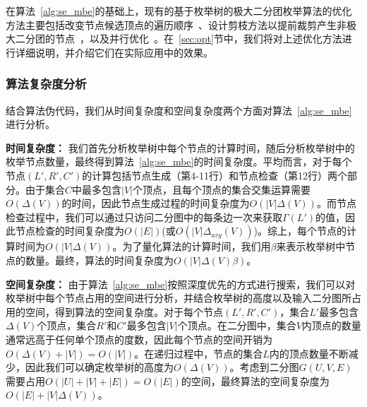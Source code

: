 在算法~\ref{alg:se_mbe}的基础上，现有的基于枚举树的极大二分团枚举算法的优化方法主要包括改变节点候选顶点的遍历顺序~\cite{minel06,iMBEA14,PMBE20,ooMBE22}、设计剪枝方法以提前裁剪产生非极大二分团的节点~\cite{iMBEA14,PMBE20,ooMBE22}，以及并行优化~\cite{mapreduceMBE16,parMBE19}。在~\ref{sec:opt}节中，我们将对上述优化方法进行详细说明，并介绍它们在实际应用中的效果。

\subsubsection{算法复杂度分析}
\label{subsec:baseline_analysis}

结合算法伪代码，我们从时间复杂度和空间复杂度两个方面对算法~\ref{alg:se_mbe}进行分析。

\textbf{时间复杂度：} 我们首先分析枚举树中每个节点的计算时间，随后分析枚举树中的枚举节点数量，最终得到算法~\ref{alg:se_mbe}的时间复杂度。平均而言，对于每个节点$(L',R',C')$的计算包括节点生成（第4-11行）和节点检查（第12行）两个部分。由于集合$C$中最多包含$|V|$个顶点，且每个顶点的集合交集运算需要$O(\Delta(V))$的时间，因此节点生成过程的时间复杂度为$O(|V|\Delta(V))$。而节点检查过程中，我们可以通过只访问二分图中的每条边一次来获取$\Gamma(L')$的值，因此节点检查的时间复杂度为$O(|E|)$(或$O(|V|\Delta_{avg}(V))$)。综上，每个节点的计算时间为$O(|V|\Delta(V))$。为了量化算法的计算时间，我们用$\beta$来表示枚举树中节点的数量。最终，算法的时间复杂度为$O(|V|\Delta(V)\beta)$。

\textbf{空间复杂度：} 由于算法~\ref{alg:se_mbe}按照深度优先的方式进行搜索，我们可以对枚举树中每个节点占用的空间进行分析，并结合枚举树的高度以及输入二分图所占用的空间，得到算法的空间复杂度。对于每个节点$(L',R',C')$，集合$L'$最多包含$\Delta(V)$个顶点，集合$R'$和$C'$最多包含$|V|$个顶点。在二分图中，集合$V$内顶点的数量通常远高于任何单个顶点的度数，因此每个节点的空间开销为$O(\Delta(V)+|V|)=O(|V|)$。在递归过程中，节点的集合$L$内的顶点数量不断减少，因此我们可以确定枚举树的高度为$O(\Delta(V))$。考虑到二分图$G(U,V,E)$需要占用$O(|U|+|V|+|E|)=O(|E|)$的空间，最终算法的空间复杂度为$O(|E|+|V|\Delta(V))$。

